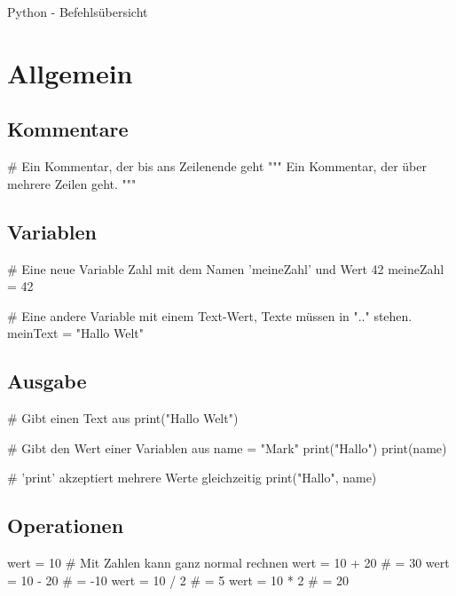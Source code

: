 \documentclass{\VorlagenPfad/coderdojokatext}
\newcommand{\Titel}{Python - Befehlsübersicht}
\begin{document}
\setcounter{chapter}{1}

\begin{center}
	{\huge \Titel}
\end{center}

\section{Allgemein}
\subsection{Kommentare}
\begin{pythoncode}
# Ein Kommentar, der bis ans Zeilenende geht
"""
Ein Kommentar, der über
mehrere Zeilen geht.
"""
\end{pythoncode}
\subsection{Variablen}
\begin{pythoncode}
# Eine neue Variable Zahl mit dem Namen 'meineZahl' und Wert 42
meineZahl = 42

# Eine andere Variable mit einem Text-Wert, Texte müssen in ".." stehen.
meinText = "Hallo Welt"
\end{pythoncode}

\subsection{Ausgabe}

\begin{pythoncode}
# Gibt einen Text aus
print("Hallo Welt")

\end{pythoncode}
\begin{pythoncode}
# Gibt den Wert einer Variablen aus
name = "Mark"
print("Hallo")
print(name)

# 'print' akzeptiert mehrere Werte gleichzeitig
print("Hallo", name)
\end{pythoncode}

\subsection{Operationen}
\begin{pythoncode}
wert  = 10 # Mit Zahlen kann ganz normal rechnen
wert = 10 + 20  # = 30
wert = 10 - 20  # = -10
wert = 10 / 2   # = 5
wert = 10 * 2   # = 20
\end{pythoncode}
\end{document}
